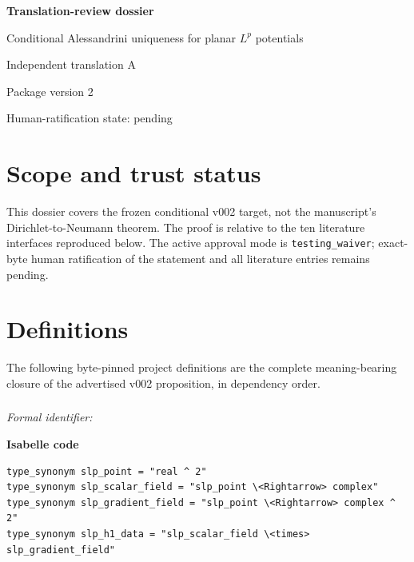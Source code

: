 \documentclass[10pt,oneside]{article}
\newcommand{\reviewlabel}[1]{\par\smallskip\noindent\textsf{\bfseries #1}\par\smallskip}
\begin{document}
\begin{titlepage}
\centering
\vspace*{0.15\textheight}
{\LARGE\bfseries Translation-review dossier\par}
\vspace{1.2em}
{\Large Conditional Alessandrini uniqueness for planar \(L^p\) potentials\par}
\vspace{1em}
{\large Independent translation A\par}
\vfill
{Package version 2\par}
{Human-ratification state: pending\par}
\end{titlepage}
\tableofcontents
\clearpage

\section{Scope and trust status}
This dossier covers the frozen conditional v002 target, not the manuscript's
Dirichlet-to-Neumann theorem. The proof is relative to the ten literature
interfaces reproduced below. The active approval mode is
\texttt{testing\_waiver}; exact-byte human ratification of the statement and
all literature entries remains pending.

\section{Definitions}
The following byte-pinned project definitions are the complete meaning-bearing
closure of the advertised v002 proposition, in dependency order.
\subsubsection{\texttt{}}
\noindent\textit{Formal identifier:} \texttt{}

\reviewlabel{Isabelle code}
\begin{lstlisting}
type_synonym slp_point = "real ^ 2"
type_synonym slp_scalar_field = "slp_point \<Rightarrow> complex"
type_synonym slp_gradient_field = "slp_point \<Rightarrow> complex ^ 2"
type_synonym slp_h1_data = "slp_scalar_field \<times> slp_gradient_field"
\end{lstlisting}
\end{document}

